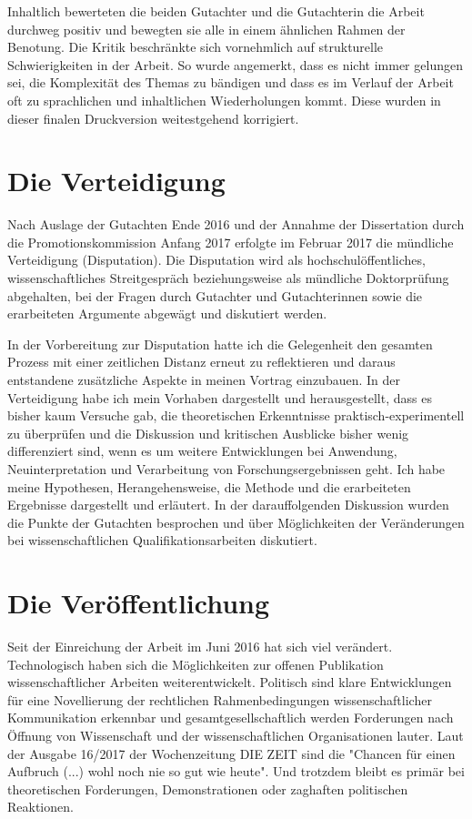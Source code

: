 Inhaltlich bewerteten die beiden Gutachter und die Gutachterin die Arbeit durchweg positiv und bewegten sie alle in einem ähnlichen Rahmen der Benotung. Die Kritik beschränkte sich vornehmlich auf strukturelle Schwierigkeiten in der Arbeit. So wurde angemerkt, dass es nicht immer gelungen sei, die Komplexität des Themas zu bändigen und dass es im Verlauf der Arbeit oft zu sprachlichen und inhaltlichen Wiederholungen kommt. Diese wurden in dieser finalen Druckversion weitestgehend korrigiert.

\section{Die Verteidigung}

Nach Auslage der Gutachten Ende 2016 und der Annahme der Dissertation durch die Promotionskommission Anfang 2017 erfolgte im Februar 2017 die mündliche Verteidigung (Disputation). Die Disputation wird als hochschulöffentliches, wissenschaftliches Streitgespräch beziehungsweise als mündliche Doktorprüfung abgehalten, bei der Fragen durch Gutachter und Gutachterinnen sowie die erarbeiteten Argumente abgewägt und diskutiert werden.

In der Vorbereitung zur Disputation hatte ich die Gelegenheit den gesamten Prozess mit einer zeitlichen Distanz erneut zu reflektieren und daraus entstandene zusätzliche Aspekte in meinen Vortrag einzubauen. In der Verteidigung habe ich mein Vorhaben dargestellt und herausgestellt, dass es bisher kaum Versuche gab, die theoretischen Erkenntnisse praktisch-experimentell zu überprüfen und die Diskussion und kritischen Ausblicke bisher wenig differenziert sind, wenn es um weitere Entwicklungen bei Anwendung, Neuinterpretation und Verarbeitung von Forschungsergebnissen geht. Ich habe meine Hypothesen, Herangehensweise, die Methode und die erarbeiteten Ergebnisse dargestellt und erläutert. In der darauffolgenden Diskussion wurden die Punkte der Gutachten besprochen und über Möglichkeiten der Veränderungen bei wissenschaftlichen Qualifikationsarbeiten diskutiert.

\section{Die Veröffentlichung}

Seit der Einreichung der Arbeit im Juni 2016 hat sich viel verändert. Technologisch haben sich die Möglichkeiten zur offenen Publikation wissenschaftlicher Arbeiten weiterentwickelt. Politisch sind klare Entwicklungen für eine Novellierung der rechtlichen Rahmenbedingungen wissenschaftlicher Kommunikation erkennbar und gesamtgesellschaftlich werden Forderungen nach Öffnung von Wissenschaft und der wissenschaftlichen Organisationen lauter. Laut der Ausgabe 16/2017 der Wochenzeitung DIE ZEIT sind die "Chancen für einen Aufbruch (...) wohl noch nie so gut wie heute". Und trotzdem bleibt es primär bei theoretischen Forderungen, Demonstrationen oder zaghaften politischen Reaktionen.

